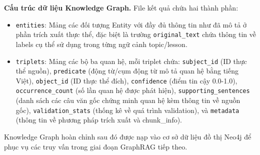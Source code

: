 \vspace{0.5em}
\noindent\textbf{Cấu trúc dữ liệu Knowledge Graph.}
File kết quả chứa hai thành phần:
\begin{itemize}
    \item \texttt{entities}: Mảng các đối tượng Entity với đầy đủ thông tin như đã mô tả ở phần trích xuất thực thể, đặc biệt là trường \texttt{original\_text} chứa thông tin về labels cụ thể sử dụng trong từng ngữ cảnh topic/lesson.
    \item \texttt{triplets}: Mảng các bộ ba quan hệ, mỗi triplet chứa: \texttt{subject\_id} (ID thực thể nguồn), \texttt{predicate} (động từ/cụm động từ mô tả quan hệ bằng tiếng Việt), \texttt{object\_id} (ID thực thể đích), \texttt{confidence} (điểm tin cậy 0.0-1.0), \texttt{occurrence\_count} (số lần quan hệ được phát hiện), \texttt{supporting\_sentences} (danh sách các câu văn gốc chứng minh quan hệ kèm thông tin về nguồn gốc), \texttt{validation\_stats} (thống kê về quá trình validation), và \texttt{metadata} (thông tin về phương pháp trích xuất và chunk\_info).
\end{itemize}

Knowledge Graph hoàn chỉnh sau đó được nạp vào cơ sở dữ liệu đồ thị Neo4j để phục vụ các truy vấn trong giai đoạn GraphRAG tiếp theo.